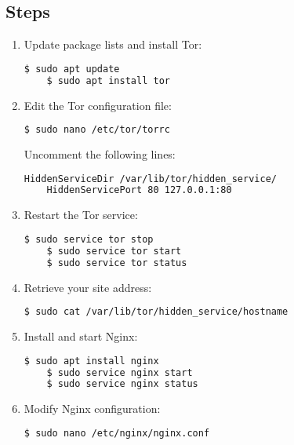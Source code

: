 \documentclass[a4paper,12pt]{article}
\begin{document}
\subsection{Steps}
\begin{enumerate}
    \item Update package lists and install Tor:
    \begin{lstlisting}[language=bash, breaklines=true, breakatwhitespace=true, columns=fullflexible]
    $ sudo apt update
    $ sudo apt install tor
    \end{lstlisting}

   \item Edit the Tor configuration file:
    \begin{lstlisting}[language=bash, breaklines=true, breakatwhitespace=true, columns=fullflexible]
    $ sudo nano /etc/tor/torrc
    \end{lstlisting}
    Uncomment the following lines:
    \begin{lstlisting}[language=bash, breaklines=true, breakatwhitespace=true, columns=fullflexible]
    HiddenServiceDir /var/lib/tor/hidden_service/
    HiddenServicePort 80 127.0.0.1:80
    \end{lstlisting}

    \item Restart the Tor service:
    \begin{lstlisting}[language=bash, breaklines=true, breakatwhitespace=true, columns=fullflexible]
    $ sudo service tor stop
    $ sudo service tor start
    $ sudo service tor status
    \end{lstlisting}

    \item Retrieve your site address:
    \begin{lstlisting}[language=bash, breaklines=true, breakatwhitespace=true, columns=fullflexible]
    $ sudo cat /var/lib/tor/hidden_service/hostname
    \end{lstlisting}

    \item Install and start Nginx:
    \begin{lstlisting}[language=bash, breaklines=true, breakatwhitespace=true, columns=fullflexible]
    $ sudo apt install nginx
    $ sudo service nginx start
    $ sudo service nginx status
    \end{lstlisting}

\item Modify Nginx configuration:
\begin{lstlisting}[language=bash, breaklines=true, breakatwhitespace=true, columns=fullflexible]
$ sudo nano /etc/nginx/nginx.conf
\end{lstlisting}


\end{enumerate}
\end{document}
